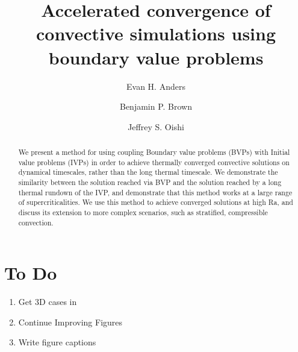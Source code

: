\documentclass[aps, pre, onecolumn, nofootinbib, notitlepage, groupedaddress, amsfonts, amssymb, amsmath, longbibliography]{revtex4-1}
\begin{document}
\author{Evan H. Anders}
\author{Benjamin P. Brown}
\author{Jeffrey S. Oishi}
\title{Accelerated convergence of convective simulations using boundary value problems}

\begin{abstract}
We present a method for using coupling Boundary value problems (BVPs) with Initial value problems (IVPs)
in order to achieve thermally converged convective solutions on dynamical timescales, rather than the
long thermal timescale.  We demonstrate the similarity between the solution reached via BVP and the
solution reached by a long thermal rundown of the IVP, and demonstrate that this method works at a
large range of supercriticalities.  We use this method to achieve converged solutions at high Ra,
and discuss its extension to more complex scenarios, such as stratified, compressible convection.
\end{abstract}
\maketitle

\section{To Do}
\begin{enumerate}
\item Get 3D cases in
\item Continue Improving Figures
\item Write figure captions
\end{enumerate}
\end{document}

